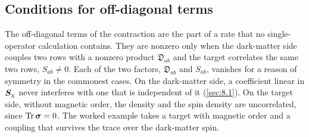\subsection{Conditions for off-diagonal terms}\label{sec:8.2-cross}

The off-diagonal terms of the contraction are the part of a rate that no single-operator calculation contains. They are nonzero only when the dark-matter side couples two rows with a nonzero product $\mathfrak{D}_{ab}$ and the target correlates the same two rows, $S_{ab} \neq 0$. Each of the two factors, $\mathfrak{D}_{ab}$ and $S_{ab}$, vanishes for a reason of symmetry in the commonest cases. On the dark-matter side, a coefficient linear in $\bm{S}_\chi$ never interferes with one that is independent of it (\cref{sec:8.1}). On the target side, without magnetic order, the density and the spin density are uncorrelated, since $\operatorname{Tr}\boldsymbol{\sigma} = 0$. The worked example takes a target with magnetic order and a coupling that survives the trace over the dark-matter spin.

